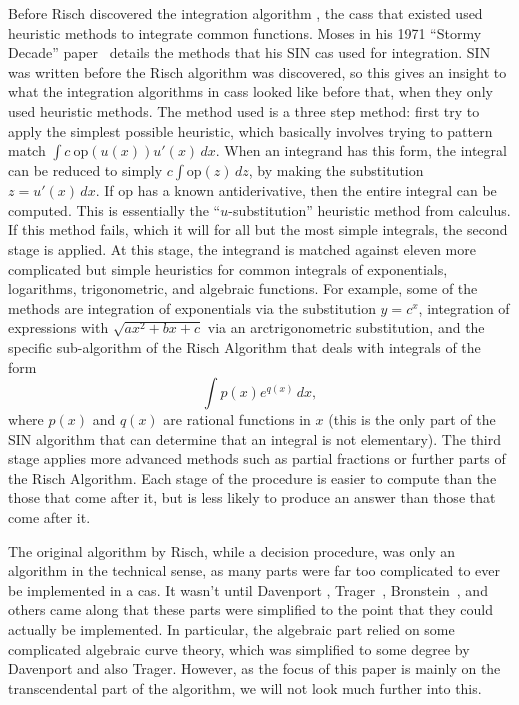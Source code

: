 Before Risch discovered the \gls{integration} algorithm
\cite{risch1969problem}, the \glspl{cas} that existed used heuristic
methods to integrate common functions. Moses in his 1971 ``Stormy
Decade'' paper~\cite{moses1971symbolic} details the methods that his SIN
\gls{cas} used for integration. SIN was written before the Risch
algorithm was discovered, so this gives an insight to what the
integration algorithms in \glspl{cas} looked like before that, when they
only used heuristic methods.  The method used is a three step method:
first try to apply the simplest possible heuristic, which basically
involves trying to pattern match $\int{c\ \mathrm{op}(u(x))u'(x)\,dx}$.
When an \gls{integrand} has this form, the integral can be reduced to
simply $c\int{\mathrm{op}(z)\,dz}$, by making the substitution
$z=u'(x)\,dx$.  If $\mathrm{op}$ has a known antiderivative, then the
entire integral can be computed.  This is essentially the
``$u$-substitution'' heuristic method from calculus.  If this method
fails, which it will for all but the most simple integrals, the second
stage is applied.  At this stage, the \gls{integrand} is matched against
eleven more complicated but simple heuristics for common integrals of
exponentials, logarithms, trigonometric, and \gls{algebraic} functions.  For
example, some of the methods are \gls{integration} of exponentials via the
substitution $y=c^x$, integration of expressions with $\sqrt{ax^2 + bx +
c}$ via an arctrigonometric substitution, and the specific
sub-algorithm of the Risch Algorithm that deals with integrals of the
form
\begin{equation}
\label{SIN exponential form}
\int{p(x)e^{q(x)}\,dx},
\end{equation}
where $p(x)$ and $q(x)$ are
\glspl{rational function} in $x$ (this is the only part of the SIN
algorithm that can determine that an integral is not \gls{elementary}).
The third stage applies more advanced methods such as partial fractions
or further parts of the Risch Algorithm.  Each stage of the procedure is
easier to compute than the those that come after it, but is less likely
to produce an answer than those that come after it.

The original algorithm by Risch, while a decision procedure, was only an
algorithm in the technical sense, as many parts were far too complicated
to ever be implemented in a \gls{cas}.  It wasn't until Davenport
\cite{davenport1984integration}, Trager~\cite{trager1984integration},
Bronstein~\cite{bronstein2005symbolic}, and others came along that
these parts were simplified to the point that they could actually be
implemented.  In particular, the \gls{algebraic} part relied on some
complicated algebraic curve theory, which was simplified to some degree
by Davenport and also Trager.  However, as the focus of this paper is
mainly on the \gls{transcendental} part of the algorithm, we will not
look much further into this.  